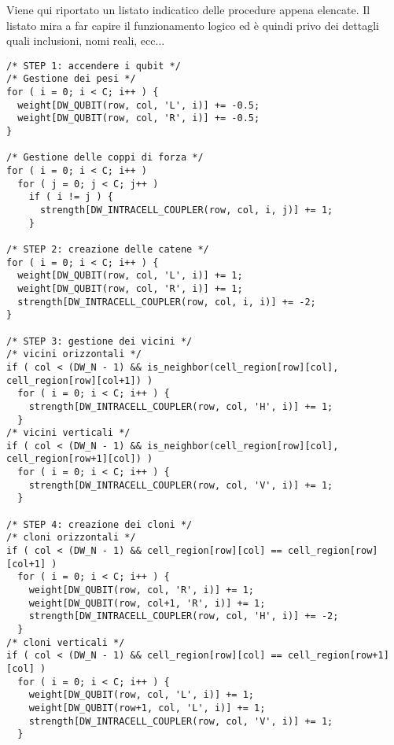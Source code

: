 Viene qui riportato un listato indicatico delle procedure appena elencate. Il listato mira a far capire il funzionamento logico ed è quindi privo dei dettagli quali inclusioni, nomi reali, ecc...
\lstset{language=C}
\begin{lstlisting}
/* STEP 1: accendere i qubit */
/* Gestione dei pesi */
for ( i = 0; i < C; i++ ) {
  weight[DW_QUBIT(row, col, 'L', i)] += -0.5;
  weight[DW_QUBIT(row, col, 'R', i)] += -0.5;
}

/* Gestione delle coppi di forza */
for ( i = 0; i < C; i++ )
  for ( j = 0; j < C; j++ )
    if ( i != j ) {
      strength[DW_INTRACELL_COUPLER(row, col, i, j)] += 1;
    }

/* STEP 2: creazione delle catene */
for ( i = 0; i < C; i++ ) {
  weight[DW_QUBIT(row, col, 'L', i)] += 1;
  weight[DW_QUBIT(row, col, 'R', i)] += 1;
  strength[DW_INTRACELL_COUPLER(row, col, i, i)] += -2;
}

/* STEP 3: gestione dei vicini */
/* vicini orizzontali */
if ( col < (DW_N - 1) && is_neighbor(cell_region[row][col], cell_region[row][col+1]) )
  for ( i = 0; i < C; i++ ) {
    strength[DW_INTRACELL_COUPLER(row, col, 'H', i)] += 1;
  }
/* vicini verticali */
if ( col < (DW_N - 1) && is_neighbor(cell_region[row][col], cell_region[row+1][col]) )
  for ( i = 0; i < C; i++ ) {
    strength[DW_INTRACELL_COUPLER(row, col, 'V', i)] += 1;
  }

/* STEP 4: creazione dei cloni */
/* cloni orizzontali */
if ( col < (DW_N - 1) && cell_region[row][col] == cell_region[row][col+1] )
  for ( i = 0; i < C; i++ ) {
    weight[DW_QUBIT(row, col, 'R', i)] += 1;
    weight[DW_QUBIT(row, col+1, 'R', i)] += 1;
    strength[DW_INTRACELL_COUPLER(row, col, 'H', i)] += -2;
  }
/* cloni verticali */
if ( col < (DW_N - 1) && cell_region[row][col] == cell_region[row+1][col] )
  for ( i = 0; i < C; i++ ) {
    weight[DW_QUBIT(row, col, 'L', i)] += 1;
    weight[DW_QUBIT(row+1, col, 'L', i)] += 1;
    strength[DW_INTRACELL_COUPLER(row, col, 'V', i)] += 1;
  }
\end{lstlisting}
